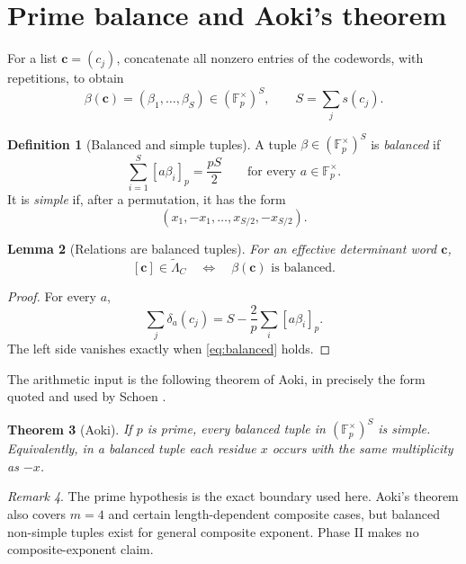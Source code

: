 \documentclass[11pt]{article}
\newtheorem{theorem}{Theorem}[section]
\newtheorem{lemma}[theorem]{Lemma}
\theoremstyle{definition}
\newtheorem{definition}[theorem]{Definition}
\theoremstyle{remark}
\newtheorem{remark}[theorem]{Remark}
\newcommand{\F}{\mathbb F}
\begin{document}
\section{Prime balance and Aoki's theorem}\label{sec:Aoki}

For a list $\mathbf c=(c_j)$, concatenate all nonzero entries of the codewords, with repetitions, to obtain
\[
 \beta(\mathbf c)=(\beta_1,\ldots,\beta_S)
 \in(\F_p^\times)^S,
 \qquad
 S=\sum_js(c_j).
\]

\begin{definition}[Balanced and simple tuples]\label{def:balanced}
A tuple $\beta\in(\F_p^\times)^S$ is \emph{balanced} if
\begin{equation}\label{eq:balanced}
 \sum_{i=1}^S[a\beta_i]_p=\frac{pS}{2}
 \qquad\text{for every }a\in\F_p^\times.
\end{equation}
It is \emph{simple} if, after a permutation, it has the form
\[
 (x_1,-x_1,\ldots,x_{S/2},-x_{S/2}).
\]
\end{definition}

\begin{lemma}[Relations are balanced tuples]\label{lem:relation-balanced}
For an effective determinant word $\mathbf c$,
\[
 [\mathbf c]\in\widetilde\Lambda_C
 \quad\Longleftrightarrow\quad
 \beta(\mathbf c)\text{ is balanced}.
\]
\end{lemma}

\begin{proof}
For every $a$,
\[
 \sum_j\delta_a(c_j)
 =S-\frac2p\sum_i[a\beta_i]_p.
\]
The left side vanishes exactly when \eqref{eq:balanced} holds.
\end{proof}

The arithmetic input is the following theorem of Aoki, in precisely the form quoted and used by Schoen \cite{Aoki}\cite[Corollary~1.9 and Aoki's theorem]{Schoen}.

\begin{theorem}[Aoki]\label{thm:Aoki}
If $p$ is prime, every balanced tuple in $(\F_p^\times)^S$ is simple.  Equivalently, in a balanced tuple each residue $x$ occurs with the same multiplicity as $-x$.
\end{theorem}

\begin{remark}
The prime hypothesis is the exact boundary used here.  Aoki's theorem also covers $m=4$ and certain length-dependent composite cases, but balanced non-simple tuples exist for general composite exponent.  Phase II makes no composite-exponent claim.
\end{remark}
\end{document}
